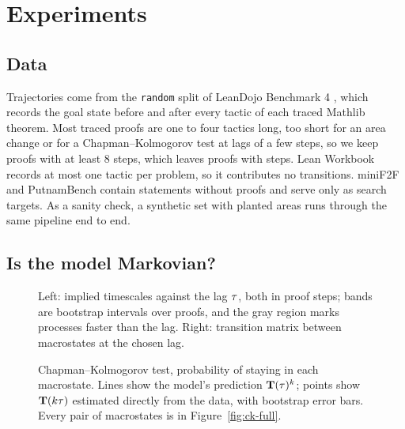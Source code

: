 \section{Experiments}
\label{sec:experiments}

\subsection{Data}
Trajectories come from the \texttt{random} split of LeanDojo Benchmark 4
\citep{yang2023leandojo}, which records the goal state before and after
every tactic of each traced Mathlib theorem. Most traced proofs are one to
four tactics long, too short for an area change or for a
Chapman--Kolmogorov test at lags of a few steps, so we keep proofs with at
least 8 steps, which leaves \resNumProofs{} proofs with \resNumSteps{} steps.
 Lean Workbook
\citep{ying2024leanworkbook} records at most one tactic per problem, so it
contributes no transitions. miniF2F and
PutnamBench contain statements without proofs and serve only as search
targets. As a sanity check, a synthetic set with planted areas runs
through the same pipeline end to end.

\begin{table}[t]
  \caption{Data. Proof counts are after filtering to at least 8 steps;
  benchmark sets contribute statements only. }
  \label{tab:data}
  \centering\small
  \setlength{\tabcolsep}{5pt}
\end{table}

\subsection{Is the model Markovian?}

\begin{figure}[t]
  \centering
  \hfill
  \caption{Left: implied timescales against the lag $\tau$, both in proof
  steps; bands are bootstrap intervals over proofs, and the gray region marks
  processes faster than the lag. Right: transition matrix between
  macrostates at the chosen lag. }
  \label{fig:its}
\end{figure}

\begin{figure}[t]
  \centering
  \caption{Chapman--Kolmogorov test, probability of staying in each
  macrostate. Lines show the model's prediction $\mathbf{T}(\tau)^k$; points show
  $\mathbf{T}(k\tau)$ estimated directly from the data, with bootstrap error bars.
  Every pair of macrostates is in Figure~\ref{fig:ck-full}.}
  \label{fig:ck}
\end{figure}

